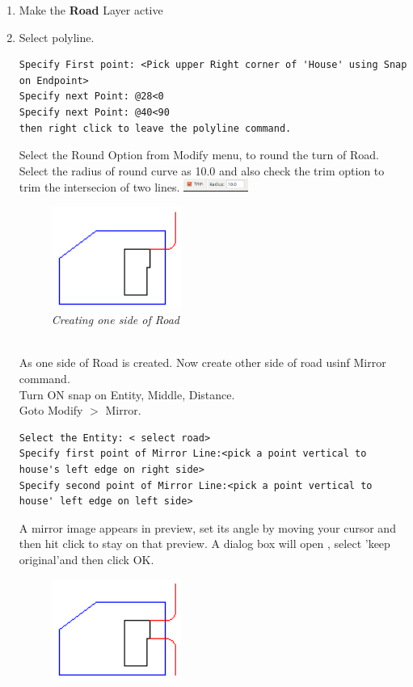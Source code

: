 \begin{enumerate}
%
\item{Make the \textbf{Road} Layer active}
\item{Select polyline.
\begin{verbatim}
Specify First point: <Pick upper Right corner of 'House' using Snap on Endpoint>
Specify next Point: @28<0
Specify next Point: @40<90
then right click to leave the polyline command.
\end{verbatim}
Select the Round Option from Modify menu, to round the turn of Road. Select the radius of round curve as 10.0 and also check the trim option to trim the intersecion of two lines.
\includegraphics[width=80px]{./images-yard/round.png}
\begin{figure}[h!]
       \centering\includegraphics[width=160px]{./images-yard/round-c.png}
       \caption{\small \sl Creating one side of Road}
       \end{figure}
\\As one side of Road is created. Now create other side of road usinf Mirror command.
\\Turn ON snap on Entity, Middle, Distance.
\\Goto Modify $>$ Mirror.
\begin{verbatim}
Select the Entity: < select road>
Specify first point of Mirror Line:<pick a point vertical to house's left edge on right side>
Specify second point of Mirror Line:<pick a point vertical to house' left edge on left side>
\end{verbatim}
A mirror image appears in preview, set its angle by moving your cursor and then hit click to stay on that preview. A dialog box will open , select 'keep original'and then click OK.
\begin{figure}[h!]
       \centering\includegraphics[width=160px]{./images-yard/road.png}

\end{figure}}
\end{enumerate}
